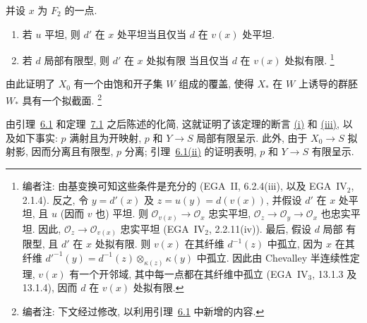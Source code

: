 
并设 \(x\) 为 \(F_2\) 的一点.

\begin{enumerate}
\item[\SGAInlineRefTarget{lem:sga3-V-7.4:item:i}(i)] 若 \(u\) 平坦, 则 \(d'\) 在 \(x\) 处平坦当且仅当
  \(d\) 在 \(v(x)\) 处平坦.
\item[(ii)] 若 \(d\) 局部有限型, 则 \(d'\) 在 \(x\) 处拟有限
  当且仅当 \(d\) 在 \(v(x)\) 处拟有限.%
  \footnote{\label{note:sga3-V-42}编者注: 由基变换可知这些条件是充分的
  (EGA~II, 6.2.4(iii), 以及
  EGA~IV\(_2\), 2.1.4). 反之, 令
  \(y=d'(x)\) 及 \(z=u(y)=d(v(x))\), 并假设 \(d'\) 在
  \(x\) 处平坦, 且 \(u\) (因而 \(v\) 也) 平坦. 则
  \(\mathcal O_{v(x)}\to\mathcal O_x\) 忠实平坦,
  \(\mathcal O_z\to\mathcal O_y\to\mathcal O_x\) 也忠实平坦. 因此,
  \(\mathcal O_z\to\mathcal O_{v(x)}\) 忠实平坦
  (EGA~IV\(_2\), 2.2.11(iv)). 最后, 假设 \(d\) 局部
  有限型, 且 \(d'\) 在 \(x\) 处拟有限. 则
  \(v(x)\) 在其纤维 \(d^{-1}(z)\) 中孤立, 因为 \(x\) 在其纤维
  \(d'^{-1}(y)=d^{-1}(z)\otimes_{\kappa(z)}\kappa(y)\) 中孤立. 因此由 Chevalley
  半连续性定理, \(v(x)\) 有一个开邻域, 其中每一点都在其纤维中孤立
  (EGA~IV\(_3\), 13.1.3 及 13.1.4), 因而 \(d\) 在
  \(v(x)\) 处拟有限.}
\end{enumerate}

由此证明了 \(X_0\) 有一个由饱和开子集 \(W\) 组成的覆盖,
使得 \(X_\ast\) 在 \(W\) 上诱导的群胚 \(W_\ast\)
具有一个拟截面.%
\footnote{\label{note:sga3-V-43}编者注: 下文经过修改,
以利用引理~\hyperref[lem:sga3-V-6.1]{6.1} 中新增的内容.}

由引理~\hyperref[lem:sga3-V-6.1]{6.1} 和定理~\hyperref[thm:sga3-V-7.1]{7.1}
之后陈述的化简, 这就证明了该定理的断言
\hyperref[thm:sga3-V-7.1-i]{(i)} 和
\hyperref[thm:sga3-V-7.1-iii]{(iii)}, 以及如下事实:
\(p\) 满射且为开映射, \(p\) 和 \(Y\to S\)
局部有限呈示. 此外, 由于 \(X_0\to S\)
拟射影, 因而分离且有限型, \(p\) 分离;
引理~\hyperref[lem:sga3-V-6.1-ii]{6.1(ii)} 的证明表明,
\(p\) 和 \(Y\to S\) 有限呈示.

